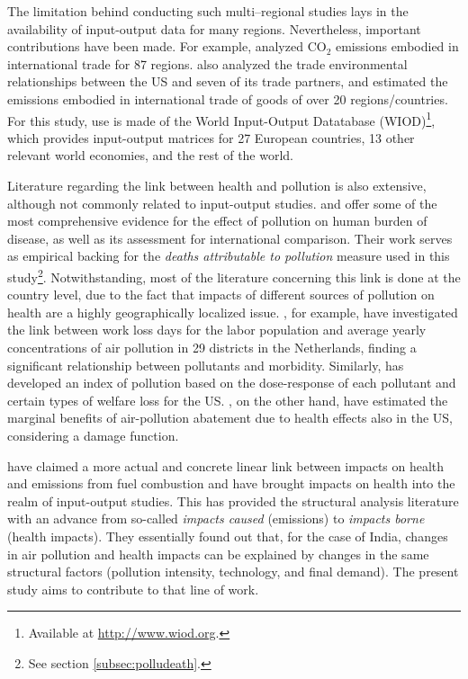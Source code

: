 \documentclass[a4paper,12pt]{article}
\begin{document}
The limitation behind conducting such multi--regional studies lays in the availability of input-output data for many regions. Nevertheless, important contributions have been made. For example, \citet{peterspost-kyoto2008} analyzed CO$_2$ emissions embodied in international trade for 87 regions. \citet{weberembodied2007} also analyzed the trade environmental relationships between the US and seven of its trade partners, and \citet{ahmadcarbon2003} estimated the emissions embodied in international trade of goods of over 20 regions/countries. For this study, use is made of the World Input-Output Datatabase (WIOD)\footnote{Available at \url{http://www.wiod.org}.}, which provides input-output matrices for 27 European countries, 13 other relevant world economies, and the rest of the world.

Literature regarding the link between health and pollution is also extensive, although not commonly related to input-output studies. \citet{cohenurban2004} and \citet{ostro2004outdoor} offer some of the most comprehensive evidence for the effect of pollution on human burden of disease, as well as its assessment for international comparison. Their work serves as empirical backing for the \textit{deaths attributable to pollution} measure used in this study\footnote{See section \ref{subsec:polludeath}.}. Notwithstanding, most of the literature concerning this link is done at the country level, due to the fact that impacts of different sources of pollution on health are a highly geographically localized issue. \citet{zuidemahealth1997}, for example, have investigated the link between work loss days for the labor population and average yearly concentrations of air pollution in 29 districts in the Netherlands, finding a significant relationship between pollutants and morbidity. Similarly, \citet{khannameasuring2000} has developed an index of pollution based on the dose-response of each pollutant and certain types of welfare loss for the US. \citet{cifuenteseconomic1993}, on the other hand, have estimated the marginal benefits of air-pollution abatement due to health effects also in the US, considering a damage function. 

\citet{mukhopadhyayforsell2005} have claimed a more actual and concrete linear link between impacts on health and emissions from fuel combustion and have brought impacts on health into the realm of input-output studies. This has provided the structural analysis literature with an advance from so-called \textit{impacts caused} (emissions) to \textit{impacts borne} (health impacts). They essentially found out that, for the case of India, changes in air pollution and health impacts can be explained by changes in the same structural factors (pollution intensity, technology, and final demand). The present study aims to contribute to that line of work.
\end{document}
